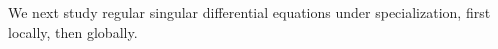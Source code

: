 \documentclass[a4paper, 11pt]{article}
\begin{document}
%
%
%
%
%




We next study regular singular differential equations under specialization, first locally, then globally.
\end{document}
